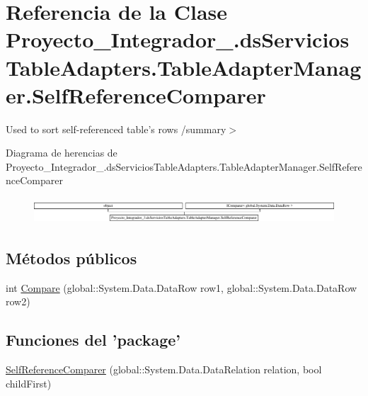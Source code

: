 \hypertarget{class_proyecto___integrador__3_1_1ds_servicios_table_adapters_1_1_table_adapter_manager_1_1_self_reference_comparer}{\section{Referencia de la Clase Proyecto\-\_\-\-Integrador\-\_.\-ds\-Servicios\-Table\-Adapters.\-Table\-Adapter\-Manager.\-Self\-Reference\-Comparer}
\label{class_proyecto___integrador__3_1_1ds_servicios_table_adapters_1_1_table_adapter_manager_1_1_self_reference_comparer}
}


Used to sort self-\/referenced table's rows /summary$>$  


Diagrama de herencias de Proyecto\-\_\-\-Integrador\-\_.\-ds\-Servicios\-Table\-Adapters.\-Table\-Adapter\-Manager.\-Self\-Reference\-Comparer\begin{figure}[H]
\begin{center}
\leavevmode
\includegraphics[height=0.975610cm]{da/d5c/class_proyecto___integrador__3_1_1ds_servicios_table_adapters_1_1_table_adapter_manager_1_1_self_reference_comparer}
\end{center}
\end{figure}
\subsection*{Métodos públicos}
\begin{DoxyCompactItemize}
\item 
int \hyperlink{class_proyecto___integrador__3_1_1ds_servicios_table_adapters_1_1_table_adapter_manager_1_1_self_reference_comparer_a8e226852fba6e592bf7d9a81be340051}{Compare} (global\-::\-System.\-Data.\-Data\-Row row1, global\-::\-System.\-Data.\-Data\-Row row2)
\end{DoxyCompactItemize}
\subsection*{Funciones del 'package'}
\begin{DoxyCompactItemize}
\item 
\hyperlink{class_proyecto___integrador__3_1_1ds_servicios_table_adapters_1_1_table_adapter_manager_1_1_self_reference_comparer_ab3a62ea6472e37e6d85704cdea28e806}{Self\-Reference\-Comparer} (global\-::\-System.\-Data.\-Data\-Relation relation, bool child\-First)
\end{DoxyCompactItemize}
